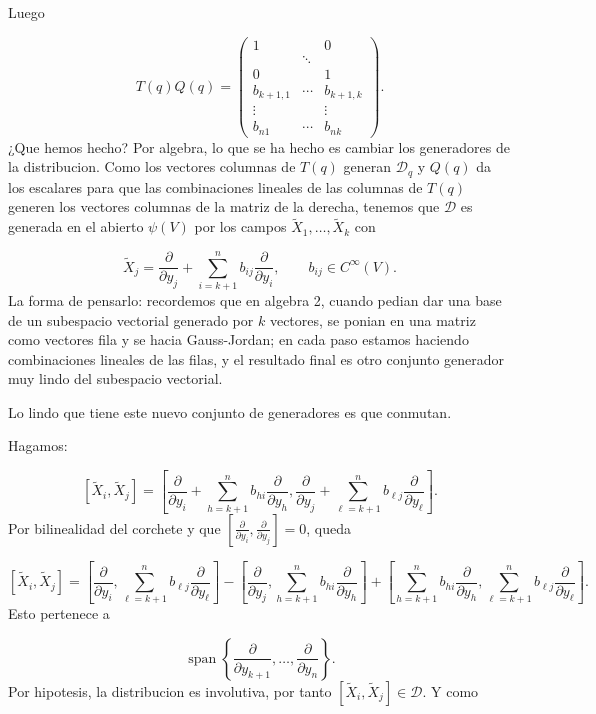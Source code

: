 \begin{bookproof}{}
Luego

\[
T(q)Q(q)=\begin{pmatrix}1& &0\\ &\ddots& \\0& &1\\ b_{k+1,1}&\cdots&b_{k+1,k}\\ \vdots& &\vdots\\ b_{n1}&\cdots&b_{nk}\end{pmatrix}.
\]
¿Que hemos hecho? Por algebra, lo que se ha hecho es cambiar los generadores de la distribucion. Como los vectores columnas de $T(q)$ generan $\mathcal D_q$ y $Q(q)$ da los escalares para que las combinaciones lineales de las columnas de $T(q)$ generen los vectores columnas de la matriz de la derecha, tenemos que $\mathcal D$ es generada en el abierto $\psi(V)$ por los campos $\widetilde X_1,\ldots,\widetilde X_k$ con

\[
\widetilde X_j=\frac{\partial}{\partial y_j}+\sum_{i=k+1}^nb_{ij}\frac{\partial}{\partial y_i},\qquad b_{ij}\in C^\infty(V).
\]
La forma de pensarlo: recordemos que en algebra 2, cuando pedian dar una base de un subespacio vectorial generado por $k$ vectores, se ponian en una matriz como vectores fila y se hacia Gauss-Jordan; en cada paso estamos haciendo combinaciones lineales de las filas, y el resultado final es otro conjunto generador muy lindo del subespacio vectorial.

Lo lindo que tiene este nuevo conjunto de generadores es que conmutan.

Hagamos:

\[
[\widetilde X_i,\widetilde X_j]=\left[\frac{\partial}{\partial y_i}+\sum_{h=k+1}^nb_{hi}\frac{\partial}{\partial y_h},\frac{\partial}{\partial y_j}+\sum_{\ell=k+1}^nb_{\ell j}\frac{\partial}{\partial y_\ell}\right].
\]
Por bilinealidad del corchete y que $\left[\frac{\partial}{\partial y_i},\frac{\partial}{\partial y_j}\right]=0$, queda

\[
[\widetilde X_i,\widetilde X_j]=\left[\frac{\partial}{\partial y_i},\sum_{\ell=k+1}^nb_{\ell j}\frac{\partial}{\partial y_\ell}\right]-\left[\frac{\partial}{\partial y_j},\sum_{h=k+1}^nb_{hi}\frac{\partial}{\partial y_h}\right]+\left[\sum_{h=k+1}^nb_{hi}\frac{\partial}{\partial y_h},\sum_{\ell=k+1}^nb_{\ell j}\frac{\partial}{\partial y_\ell}\right].
\]
Esto pertenece a

\[
\operatorname{span}\left\{\frac{\partial}{\partial y_{k+1}},\ldots,\frac{\partial}{\partial y_n}\right\}.
\]
Por hipotesis, la distribucion es involutiva, por tanto $[\widetilde X_i,\widetilde X_j]\in\mathcal D$. Y como


\end{bookproof}
